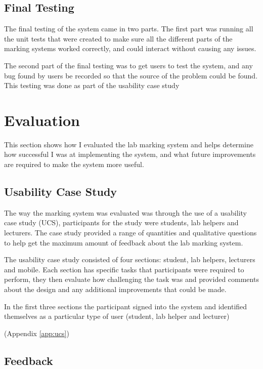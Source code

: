 \documentclass[12pt]{article}  %
\begin{document}
\subsection{Final Testing}

The final testing of the system came in two parts. The first part was  running  all the unit tests that were created to make sure all the different parts of the marking systems worked correctly, and could interact without causing any issues.

The second part of the final testing was to get users to test the system, and any bug found by users be recorded so that the source of the problem could be found. This testing was done as part of the usability case study 


\newpage
\section{Evaluation}

This section shows how I evaluated the lab marking system and helps determine how successful I was at implementing the system, and what future improvements are required to make the system more useful. 

\subsection{Usability Case Study}
The way the marking system was evaluated was through the use of a usability case study (UCS), participants for the study were students, lab helpers and lecturers. The case study provided a range of quantities and qualitative questions to help get the maximum amount of feedback about the lab marking system. 


The usability case study consisted of four sections: student, lab helpers, lecturers and mobile. Each section has specific tasks that participants were required to perform, they then evaluate how challenging the task was and provided comments about the design and any additional improvements that could be made. 

In the first three sections the participant signed into the system  and identified themselves as a particular type of user (student, lab helper and lecturer) 



(Appendix \ref{app:ucs})

\subsection{Feedback}
\end{document}
